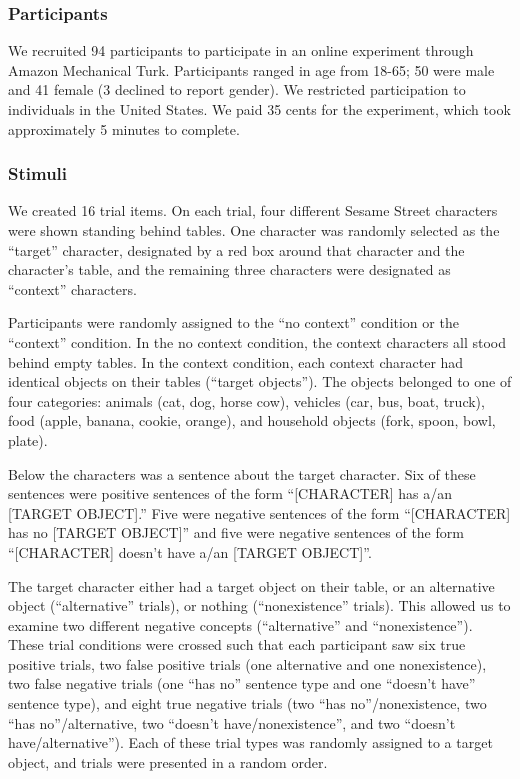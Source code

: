 \documentclass[10pt,letterpaper]{article}
\begin{document}
\subsubsection{Participants}

We recruited 94 participants to participate in an online experiment through Amazon Mechanical Turk.  Participants ranged in age from 18-65; 50 were male and 41 female (3 declined to report gender).  We restricted participation to individuals in the United States. We paid 35 cents for the experiment, which took approximately 5 minutes to complete.  

\subsubsection{Stimuli}

We created 16 trial items. On each trial, four different Sesame Street characters were shown standing behind tables.  One character was randomly selected as the ``target'' character, designated by a red box around that character and the character's table, and the remaining three characters were designated as ``context'' characters.

Participants were randomly assigned to the ``no context'' condition or the ``context'' condition.  In the no context condition, the context characters all stood behind empty tables.  In the context condition, each context character had identical objects on their tables (``target objects'').  The objects belonged to one of four categories: animals (cat, dog, horse cow), vehicles (car, bus, boat, truck), food (apple, banana, cookie, orange), and household objects (fork, spoon, bowl, plate).  

Below the characters was a sentence about the target character.  Six of these sentences were positive sentences of the form ``[CHARACTER] has a/an [TARGET OBJECT].''  Five were negative sentences of the form ``[CHARACTER] has no [TARGET OBJECT]'' and five were negative sentences of the form ``[CHARACTER] doesn't have a/an [TARGET OBJECT]''.  

The target character either had a target object on their table, or an alternative object (``alternative'' trials), or nothing (``nonexistence'' trials).  This allowed us to examine two different negative concepts (``alternative'' and ``nonexistence'').  These trial conditions were crossed such that each participant saw six true positive trials, two false positive trials (one alternative and one nonexistence), two false negative trials (one ``has no'' sentence type and one ``doesn't have'' sentence type), and eight true negative trials (two ``has no''/nonexistence, two ``has no''/alternative, two ``doesn't have/nonexistence'', and two ``doesn't have/alternative'').  Each of these trial types was randomly assigned to a target object, and trials were presented in a random order.
\end{document}
